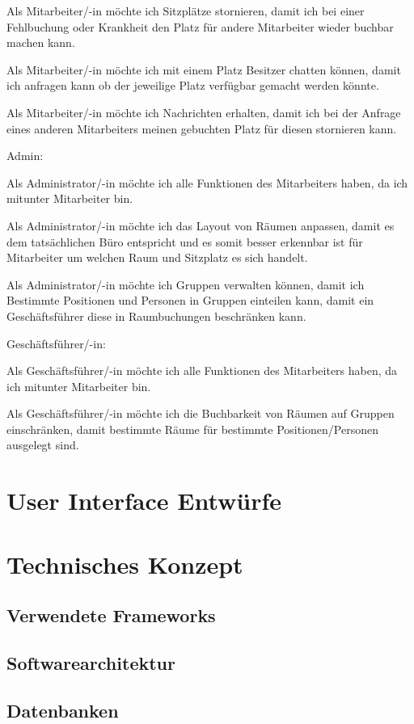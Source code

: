 \documentclass{article}
\begin{document}
Als Mitarbeiter/-in möchte ich Sitzplätze stornieren, damit ich bei einer Fehlbuchung oder Krankheit den Platz für andere Mitarbeiter wieder buchbar machen kann.

Als Mitarbeiter/-in möchte ich mit einem Platz Besitzer chatten können, damit ich anfragen kann ob der jeweilige Platz verfügbar gemacht werden könnte.

Als Mitarbeiter/-in möchte ich Nachrichten erhalten, damit ich bei der Anfrage eines anderen Mitarbeiters meinen gebuchten Platz für diesen stornieren kann.

Admin:

Als Administrator/-in möchte ich alle Funktionen des Mitarbeiters haben, da ich mitunter Mitarbeiter bin.

Als Administrator/-in möchte ich das Layout von Räumen anpassen, damit es dem tatsächlichen Büro entspricht und es somit besser erkennbar ist für Mitarbeiter um welchen Raum und Sitzplatz es sich handelt.

Als Administrator/-in möchte ich Gruppen verwalten können, damit ich Bestimmte Positionen und Personen in Gruppen einteilen kann, damit ein Geschäftsführer diese in Raumbuchungen beschränken kann.

Geschäftsführer/-in:

Als Geschäftsführer/-in möchte ich alle Funktionen des Mitarbeiters haben, da ich mitunter Mitarbeiter bin.

Als Geschäftsführer/-in möchte ich die Buchbarkeit von Räumen auf Gruppen einschränken, damit bestimmte Räume für bestimmte Positionen/Personen ausgelegt sind.


\section{User Interface Entwürfe}

\section{Technisches Konzept}

\subsection{Verwendete Frameworks}

\subsection{Softwarearchitektur}

\subsection{Datenbanken}

% 


\end{document}
